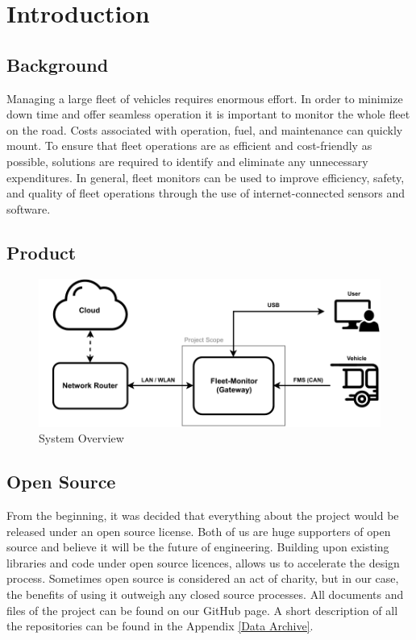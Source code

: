 \newcommand{\package}{\emph}

\chapter{Introduction}
\section{Background}
Managing a large fleet of vehicles requires enormous effort. In order to minimize down time and offer seamless operation it is important to monitor the whole fleet on the road. Costs associated with operation, fuel, and maintenance can quickly mount. To ensure that fleet operations are as efficient and cost-friendly as possible, solutions are required to identify and eliminate any unnecessary expenditures. In general, fleet monitors can be used to improve efficiency, safety, and quality of fleet operations through the use of internet-connected sensors and software.

\newpage
\section{Product}

\bigskip
\begin{figure}[h!]
	\centering
	\includegraphics[width=\textwidth]{images/System_Overview}
	\vspace{-0.3cm}
	\caption{System Overview}
	\label{fig:system-overview}
\end{figure}

\section{Open Source}
From the beginning, it was decided that everything about the project would be released under an open source license. Both of us are huge supporters of open source and believe it will be the future of engineering. Building upon existing libraries and code under open source licences, allows us to accelerate the design process. Sometimes open source is considered an act of charity, but in our case, the benefits of using it outweigh any closed source processes. All documents and files of the project can be found on our GitHub page. A short description of all the repositories can be found in the Appendix \ref{Data Archive}.
